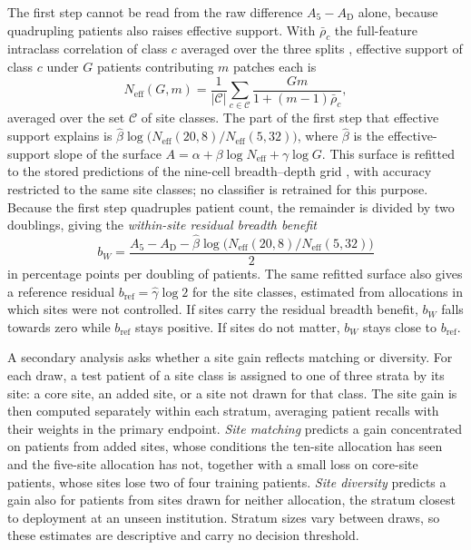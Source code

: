 \documentclass[11pt]{article}
\newcommand{\Neff}{N_{\mathrm{eff}}}
\begin{document}
The first step cannot be read from the raw difference $A_5-A_{\mathrm D}$ alone, because quadrupling patients also raises effective support. With $\bar\rho_c$ the full-feature intraclass correlation of class $c$ averaged over the three splits \citep{queisler2026multidirectionalRedundancy}, effective support of class $c$ under $G$ patients contributing $m$ patches each is
\begin{equation}
 \Neff(G,m)=\frac{1}{|\mathcal C|}\sum_{c\in\mathcal C}\frac{Gm}{1+(m-1)\bar\rho_c},
 \label{eq:neff}
\end{equation}
\noindent averaged over the set $\mathcal C$ of site classes. The part of the first step that effective support explains is $\hat\beta\log\bigl(\Neff(20,8)/\Neff(5,32)\bigr)$, where $\hat\beta$ is the effective-support slope of the surface $A=\alpha+\beta\log\Neff+\gamma\log G$. This surface is refitted to the stored predictions of the nine-cell breadth--depth grid \citep{queisler2026effectiveSupport}, with accuracy restricted to the same site classes; no classifier is retrained for this purpose. Because the first step quadruples patient count, the remainder is divided by two doublings, giving the \emph{within-site residual breadth benefit}
\begin{equation}
 b_W=\frac{A_5-A_{\mathrm D}-\hat\beta\log\bigl(\Neff(20,8)/\Neff(5,32)\bigr)}{2}
 \label{eq:within-site}
\end{equation}
\noindent in percentage points per doubling of patients. The same refitted surface also gives a reference residual $b_{\mathrm{ref}}=\hat\gamma\log 2$ for the site classes, estimated from allocations in which sites were not controlled. If sites carry the residual breadth benefit, $b_W$ falls towards zero while $b_{\mathrm{ref}}$ stays positive. If sites do not matter, $b_W$ stays close to $b_{\mathrm{ref}}$.

A secondary analysis asks whether a site gain reflects matching or diversity. For each draw, a test patient of a site class is assigned to one of three strata by its site: a core site, an added site, or a site not drawn for that class. The site gain is then computed separately within each stratum, averaging patient recalls with their weights in the primary endpoint. \emph{Site matching} predicts a gain concentrated on patients from added sites, whose conditions the ten-site allocation has seen and the five-site allocation has not, together with a small loss on core-site patients, whose sites lose two of four training patients. \emph{Site diversity} predicts a gain also for patients from sites drawn for neither allocation, the stratum closest to deployment at an unseen institution. Stratum sizes vary between draws, so these estimates are descriptive and carry no decision threshold.
\end{document}
